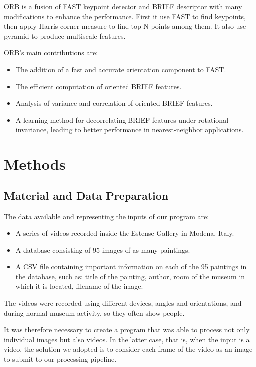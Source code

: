 \documentclass[10pt,twocolumn,letterpaper]{article}
\begin{document}
ORB is a fusion of FAST keypoint detector and BRIEF descriptor with many modifications to enhance the performance. First it use FAST to find keypoints, then apply Harris corner measure to find top N points among them. It also use pyramid to produce multiscale-features.

ORB's main contributions are:
\begin{itemize}
   \item The addition of a fast and accurate orientation component to FAST.
   \item The efficient computation of oriented BRIEF features.
   \item Analysis of variance and correlation of oriented BRIEF features.
   \item A learning method for decorrelating BRIEF features under rotational invariance, leading to better performance in nearest-neighbor applications.
\end{itemize}
 

\section{Methods}

\subsection{Material and Data Preparation}

The data available and representing the inputs of our program are:
\begin{itemize}
   \item A series of videos recorded inside the Estense Gallery in Modena, Italy.
   \item A database consisting of 95 images of as many paintings.
   \item A CSV file containing important information on each of the 95 paintings in the database, such as: title of the painting, author, room of the museum in which it is located, filename of the image.
\end{itemize}

The videos were recorded using different devices, angles and orientations, and during normal museum activity, so they often show people.

It was therefore necessary to create a program that was able to process not only individual images but also videos.
In the latter case, that is, when the input is a video, the solution we adopted is to consider each frame of the video as an image to submit to our processing pipeline.
\end{document}
